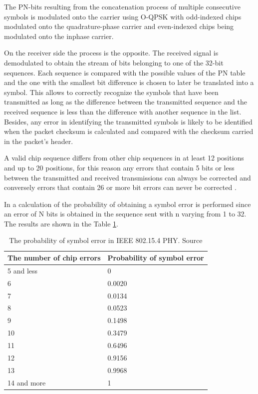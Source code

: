 \documentclass[journal]{IEEEtran}	%
\begin{document}
The PN-bits resulting from the concatenation process of multiple consecutive symbols is modulated onto the carrier using O-QPSK with odd-indexed chips modulated onto the quadrature-phase carrier and even-indexed chips being modulated onto the inphase carrier.

On the receiver side the process is the opposite. The received signal is demodulated to obtain the stream of bits belonging to one of the 32-bit sequences. Each sequence is compared with the possible values of the PN table and the one with the smallest bit difference is chosen to later be translated into a symbol. This allows to correctly recognize the symbols that have been transmitted as long as the difference between the transmitted sequence and the received sequence is less than the difference with another sequence in the list. Besides, any error in identifying the transmitted symbols is likely to be identified when the packet checksum is calculated and compared with the checksum carried in the packet’s header.

A valid chip sequence differs from other chip sequences in at least 12 positions and up to 20 positions, for this reason any errors that contain 5 bits or less between the transmitted and received transmissions can always be corrected and conversely errors that contain 26 or more bit errors can never be corrected \cite{goyal2010evaluating}.

In \cite{goyal2010evaluating} a calculation of the probability of obtaining a symbol error is performed since an error of N bits is obtained in the sequence sent with n varying from 1 to 32. The results are shown in the Table \ref{tab:probability}.

\begin{table}[t]
    \renewcommand{\arraystretch}{1.25}		%
    \centering
    \caption{The probability of symbol error in IEEE 802.15.4 PHY. Source \cite{goyal2010evaluating}}	%
    \label{tab:probability}
    \begin{tabular}{l|l}					%
    \hline \hline
    \textbf{The number of chip errors}        &    \textbf{Probability of symbol error}\\
    \hline
    5 and less          &   0\\
    6                   &   0.0020\\
    7                   &   0.0134\\
    8                   &   0.0523\\
    9                   &   0.1498\\
    10                  &   0.3479\\
    11                  &   0.6496\\
    12                  &   0.9156\\
    13                  &   0.9968\\
    14 and more         &   1\\
    \hline \hline
    \end{tabular}
\end{table}
\end{document}
